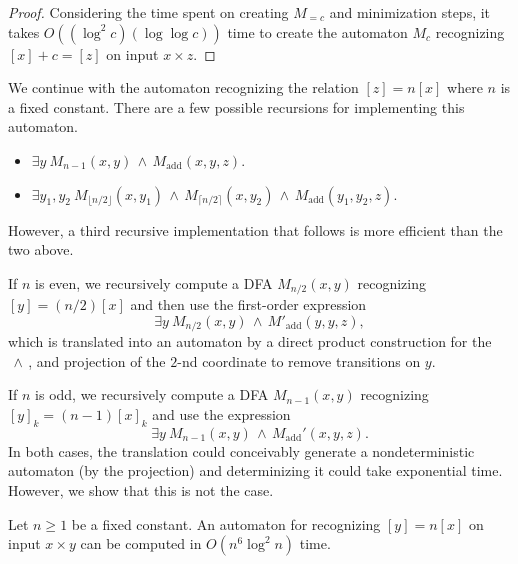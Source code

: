 \documentclass[12pt,reqno]{article}
\def\AND{\, \wedge \, }
\DeclareMathOperator{\add}{add}
\begin{document}
\begin{proof}
    \sloppy
Considering the time spent on creating $M_{=c}$ and minimization steps, it takes $O((\log^2 c)(\log \log c))$ time to create the automaton $M_c$ recognizing $[x] + c = [z]$ on input $x \times z$.   
\end{proof}



We continue with the automaton recognizing the relation $[z] = n[x]$ where $n$ is a fixed constant. 
There are a few possible recursions for implementing this automaton.
\begin{itemize} [nosep]
    \item $\exists y \ M_{n-1}(x,y) \AND M_{\add}(x, y, z)$.
    \item  $\exists y_1, y_2 \ M_{\lfloor n/2 \rfloor}(x,y_1) \AND M_{\lceil n/2 \rceil}(x,y_2) \AND M_{\add}(y_1, y_2, z)$.
\end{itemize}
However, a third recursive implementation that follows is more efficient than the two above.

If $n$ is even, we
recursively compute a DFA $M_{n/2}(x,y)$ recognizing $[y] =  (n/2)[x]$
and then use the first-order expression
$$ \exists y \ M_{n/2}(x,y) \AND M'_{\add}(y, y, z),$$
which is translated into an automaton by a direct product construction
for the $\AND$, and projection of the $2$-nd coordinate to remove
transitions on $y$. 

If $n$ is odd, we recursively compute
a DFA $M_{n-1}(x,y)$ recognizing $[y]_k = (n-1)[x]_k$ and use the expression
$$ \exists y \ M_{n-1}(x,y) \AND M_{\add}'(x, y, z).$$
In both cases, the translation could conceivably generate a nondeterministic automaton (by the projection) and determinizing it could take exponential time.
However,  we show that this is not the case. 


\begin{theorem} \label{theorem:M_n-buchi}
        Let $n \geq 1$ be a fixed constant.
    An automaton for recognizing $[y] = n[x]$ on input $x \times y$ can be computed in $O(n^6 \log^2 n)$ time. 
\end{theorem}
\end{document}
